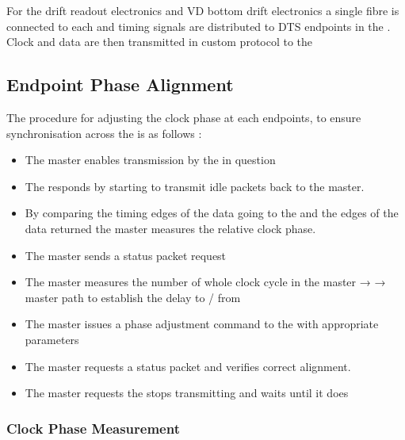 \documentclass{dune}
\begin{document}
For the  drift readout electronics and VD bottom drift electronics a single fibre is connected to each  and timing signals are distributed to DTS endpoints in the . Clock and data are then transmitted in custom protocol to the 

\subsection{Endpoint Phase Alignment}

The procedure for adjusting the clock phase at each  endpoints, to ensure synchronisation across the  is as follows :
\begin{itemize}
    \item The master enables transmission by the  in question 
    \item The  responds by starting to transmit idle packets back to the master.
    \item By comparing the timing edges of the data going to the  and the edges of the data returned the master measures the relative clock phase.
    \item The master sends a status packet request
    \item The master measures the number of whole clock cycle in the master →  → master path to establish the delay to / from 
    \item The master issues a phase adjustment command to the  with appropriate parameters
    \item The master requests a status packet and verifies correct alignment.
    \item The master requests the  stops transmitting and waits until it does
\end{itemize}

\subsubsection{Clock Phase Measurement}
\end{document}
